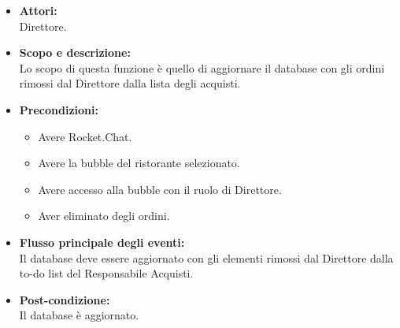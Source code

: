 
\begin{itemize}
	\item \textbf{Attori:}
	\\Direttore.
	\item \textbf{Scopo e descrizione:} 
	\\Lo scopo di questa funzione è quello di aggiornare il database con gli ordini rimossi dal Direttore dalla lista degli acquisti.
	\item \textbf{Precondizioni:}
	\begin{itemize}
		\item Avere Rocket.Chat.
		\item Avere la bubble del ristorante selezionato.
		\item Avere accesso alla bubble con il ruolo di Direttore.
		\item Aver eliminato degli ordini.
	\end{itemize}
	\item \textbf{Flusso principale degli eventi:}
	\\Il database deve essere aggiornato con gli elementi rimossi dal Direttore dalla to-do list del Responsabile Acquisti.
	\item \textbf{Post-condizione:}
	\\Il database è aggiornato.
\end{itemize}
